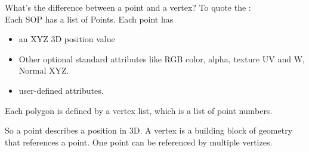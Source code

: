 \begin{framed}
  What's the difference between a point and a vertex? To quote the :\\
  Each SOP has a list of Points. Each point has
  \begin{itemize}
     \item an XYZ 3D position value
     \item Other optional standard attributes like RGB color, alpha, texture UV and W, Normal XYZ.
     \item user-defined attributes.
   \end{itemize}
Each polygon is defined by a vertex list, which is a list of point numbers.

So a point describes a position in 3D. A vertex is a building block of geometry that references a point. One point can be referenced by multiple vertizes.

\end{framed}
